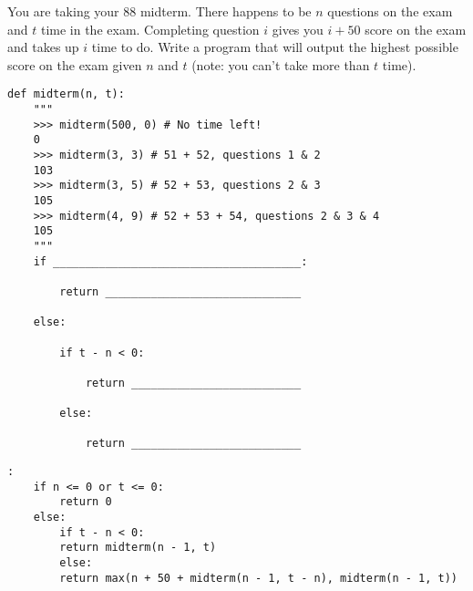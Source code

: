\begin{blocksection}
\question You are taking your 88 midterm. There happens to be $n$ questions on the exam and $t$ time in the exam. Completing question $i$ gives you $i + 50$ score on the exam and takes up $i$ time to do. Write a program that will output the highest possible score on the exam given $n$ and $t$ (note: you can't take more than $t$ time). \\

\begin{lstlisting}
def midterm(n, t):
    """
    >>> midterm(500, 0) # No time left!
    0 
    >>> midterm(3, 3) # 51 + 52, questions 1 & 2
    103
    >>> midterm(3, 5) # 52 + 53, questions 2 & 3
    105 
    >>> midterm(4, 9) # 52 + 53 + 54, questions 2 & 3 & 4
    105
    """		
    if ______________________________________:		

        return ______________________________	

    else:

        if t - n < 0:	

            return __________________________	

        else:

            return __________________________
\end{lstlisting}

\begin{solution}[1in]
\begin{lstlisting}:
    if n <= 0 or t <= 0:
        return 0
    else:
        if t - n < 0:
	    return midterm(n - 1, t)
        else:
	    return max(n + 50 + midterm(n - 1, t - n), midterm(n - 1, t))
\end{lstlisting}
\end{solution}
\end{blocksection}
